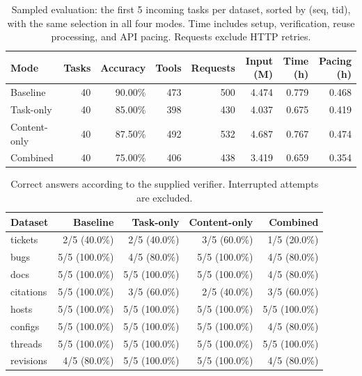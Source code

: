 \begin{table}[ht]
\centering\small
\begin{tabular}{lrrrrrrr}
\toprule
Mode & Tasks & Accuracy & Tools & Requests & Input (M) & Time (h) & Pacing (h) \\
\midrule
Baseline & 40 & 90.00\% & 473 & 500 & 4.474 & 0.779 & 0.468 \\
Task-only & 40 & 85.00\% & 398 & 430 & 4.037 & 0.675 & 0.419 \\
Content-only & 40 & 87.50\% & 492 & 532 & 4.687 & 0.767 & 0.474 \\
Combined & 40 & 75.00\% & 406 & 438 & 3.419 & 0.659 & 0.354 \\
\bottomrule
\end{tabular}
\caption{Sampled evaluation: the first 5 incoming tasks per dataset, sorted by (seq, tid), with the same selection in all four modes. Time includes setup, verification, reuse processing, and API pacing. Requests exclude HTTP retries.}
\label{tab:online-aggregate}
\end{table}
\begin{table}[ht]
\centering\small
\begin{tabular}{lrrrr}
\toprule
Dataset & Baseline & Task-only & Content-only & Combined \\
\midrule
tickets & 2/5 (40.0\%) & 2/5 (40.0\%) & 3/5 (60.0\%) & 1/5 (20.0\%) \\
bugs & 5/5 (100.0\%) & 4/5 (80.0\%) & 5/5 (100.0\%) & 4/5 (80.0\%) \\
docs & 5/5 (100.0\%) & 5/5 (100.0\%) & 5/5 (100.0\%) & 4/5 (80.0\%) \\
citations & 5/5 (100.0\%) & 3/5 (60.0\%) & 2/5 (40.0\%) & 3/5 (60.0\%) \\
hosts & 5/5 (100.0\%) & 5/5 (100.0\%) & 5/5 (100.0\%) & 5/5 (100.0\%) \\
configs & 5/5 (100.0\%) & 5/5 (100.0\%) & 5/5 (100.0\%) & 4/5 (80.0\%) \\
threads & 5/5 (100.0\%) & 5/5 (100.0\%) & 5/5 (100.0\%) & 5/5 (100.0\%) \\
revisions & 4/5 (80.0\%) & 5/5 (100.0\%) & 5/5 (100.0\%) & 4/5 (80.0\%) \\
\bottomrule
\end{tabular}
\caption{Correct answers according to the supplied verifier. Interrupted attempts are excluded.}
\label{tab:online-accuracy}
\end{table}
